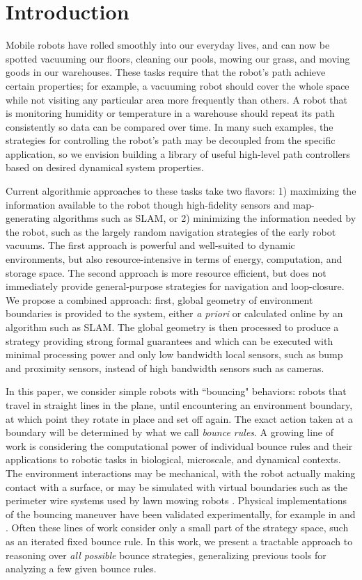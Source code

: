 \documentclass[]{styles/svproc}  %
\begin{document}
\section{Introduction}

Mobile robots have rolled smoothly into our everyday lives, and can now be
spotted vacuuming our floors, cleaning our pools, mowing our grass, and moving
goods in our warehouses. These tasks require that the robot's path achieve certain properties; for example, a 
vacuuming robot should cover the whole space while not visiting 
any particular area more frequently than others. A robot that is monitoring
humidity or temperature in a warehouse should repeat its path consistently so data 
can be compared over time. In many such examples, the strategies for controlling 
the robot's path may be decoupled from the specific application, so we envision building a
library of useful high-level path controllers based on desired dynamical system
properties.

Current algorithmic approaches to these tasks take two flavors: 1) maximizing
the information available to the robot though high-fidelity sensors and
map-generating algorithms such as SLAM, or 2) minimizing the information needed
by the robot, such as the largely random navigation strategies of the early
robot vacuums. The first approach is powerful and well-suited to dynamic
environments, but also resource-intensive in terms of energy, computation, and
storage space. The second approach is more resource efficient, but does not
immediately provide general-purpose strategies for navigation and loop-closure.
We propose a combined approach: first, global geometry of environment boundaries
is provided to the system, either \emph{a priori} or calculated online by an
algorithm such as SLAM. The global geometry is then processed to produce a
strategy providing strong formal guarantees and which can be executed with
minimal processing power and only low bandwidth local sensors, such as bump and
proximity sensors, instead of high bandwidth sensors such as cameras.

In this paper, we consider simple robots with ``bouncing" behaviors: robots that
travel in straight lines in the plane, until encountering an environment
boundary, at which point they rotate in place and set off again. The exact
action taken at a boundary will be determined by what we call {\em bounce rules}.
A growing line of work is considering the computational power of individual
bounce rules and their applications to robotic tasks in biological, microscale, 
and dynamical contexts. The environment interactions may be mechanical,
with the robot actually making contact with a surface, or may be simulated with
virtual boundaries such as the perimeter wire systems used by lawn mowing robots
\cite{sahin2007household}. Physical implementations of the bouncing maneuver have
been validated experimentally, for example in \cite{alam2018space} and \cite{LewOKa13}. 
Often these lines of work consider only a small
part of the strategy space, such as an iterated fixed bounce rule. In this work, 
we present a tractable approach to reasoning over {\em all possible} bounce strategies,
generalizing previous tools for analyzing a few given bounce rules.
\end{document}
